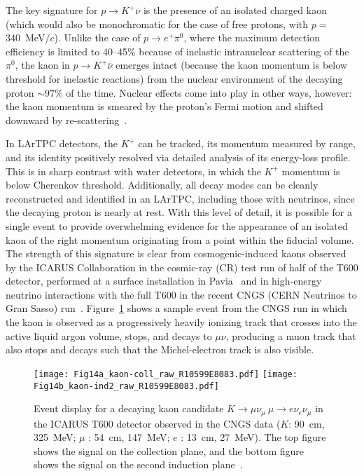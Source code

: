 The key signature for $p\to K^+\overline{\nu}$ is the presence of an
isolated charged kaon (which would also be monochromatic 
for the case of free protons, with $p=$\SI{340}{\MeV}$/c$).  
Unlike the case of $p\to e^+\pi^0$, where the maximum
detection efficiency is limited to 40--45\% because of inelastic
intranuclear scattering of the $\pi^0$, the kaon in $p\to
K^+\overline{\nu}$ emerges intact (because the kaon momentum is 
below threshold for inelastic reactions)
from the nuclear environment of the decaying proton $\sim 97\%$ of the
time.  Nuclear effects come into play in other ways, however: the kaon
momentum is smeared by the proton's Fermi motion and shifted downward
by re-scattering~\cite{Stefan:2008zi}. 


In LArTPC detectors, the $K^+$ can be tracked, its momentum measured
by range, and its identity positively resolved via detailed analysis
of its energy-loss profile.  This is in sharp contrast with water 
detectors, in which the $K^+$ momentum is below Cherenkov threshold.
Additionally, all decay modes can be cleanly reconstructed 
and identified in an LArTPC, including those with neutrinos,
since the decaying proton is nearly at rest.  With this level of
detail, it is possible for a single event to provide overwhelming
evidence for the appearance of an isolated kaon of the right momentum
originating from a point within the fiducial volume.  The strength of
this signature is clear from cosmogenic-induced kaons observed by the
ICARUS Collaboration in the cosmic-ray (CR) test run of half of the T600
detector, performed at a surface installation in Pavia~\cite{Amerio:2004ze} 
and in high-energy neutrino interactions with the full T600 in the recent 
CNGS (CERN Neutrinos to Gran Sasso) run~\cite{Antonello:2012hu}.
Figure~\ref{fig:icaruskaon} shows a sample event from the CNGS run in
which the kaon is observed as a progressively heavily ionizing track 
that crosses into the active liquid argon volume, stops, and
decays to $\mu\nu$, producing a muon track that also stops and decays
such that the Michel-electron track is also visible. 
%
\begin{figure}[!htb]
\centering
\texttt{[image: Fig14a\_kaon-coll\_raw\_R10599E8083.pdf]}
\texttt{[image: Fig14b\_kaon-ind2\_raw\_R10599E8083.pdf]}
\caption[Decaying kaon observed during the ICARUS run at CNGS]
{Event display for a decaying kaon candidate $K \rightarrow \mu \nu_\mu \ \mu \rightarrow e \nu_e \nu_\mu$ 
in the ICARUS T600 detector observed
in the CNGS data ($K$: \SI{90}{\cm}, \SI{325}{\MeV}; $\mu$ : \SI{54}{\cm}, \SI{147}{\MeV}; 
$e$ : \SI{13}{\cm}, \SI{27}{\MeV}). The top figure shows the signal on the collection plane,
  and the bottom figure shows the signal on the second induction plane~\cite{Antonello:2012hu}.}
\label{fig:icaruskaon}
\end{figure}

